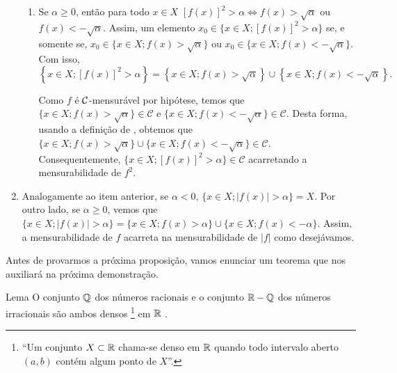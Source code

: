 \begin{prova}
\begin{enumerate}[label*=(\alph*)]
\begin{enumerate}[label = (\roman*)]
                \item Se $\alpha \geq 0$, então para todo $x \in X$ $[f(x)]^2 > \alpha \Leftrightarrow f(x) > \sqrt{\alpha}$ ou $f(x) < -\sqrt{\alpha}$.
                Assim, um elemento 
                $x_0 \in \{x \in X; [f(x)]^2 > \alpha\}$ se, e somente se, $x_0 \in \{x \in X; f(x)> \sqrt{\alpha}\}$ ou \linebreak $x_0 \in \{x \in X; f(x)< -\sqrt{\alpha}\}$.
                Com isso, 
                \vspace{-0.4cm}
                $$\left\{x \in X; [f(x)]^2 > \alpha\right\} = \left\{x \in X; f(x)> \sqrt{\alpha}\right\}\cup \left\{x \in X; f(x)< -\sqrt{\alpha}\right\}.$$
                
                \vspace{-0.4cm}
                Como $f$ é $\operatorname{\mathcal{C}}$-mensurável por hipótese, temos que $\{x \in X; f(x)> \sqrt{\alpha}\} \in \mathcal{C}$ e \linebreak $\{x \in X; f(x)< -\sqrt{\alpha}\} \in \mathcal{C}$.
                Desta forma, usando a definição de \sigal, obtemos que  $\{x \in X; f(x)> \sqrt{\alpha}\} \cup \{x \in X; f(x)< -\sqrt{\alpha}\} \in \mathcal{C}$. Consequentemente, 
                $\{x \in X; [f(x)]^2 > \alpha\} \in \mathcal{C}$ acarretando a mensurabilidade de $f^2$.
            \end{enumerate}
        \item Analogamente ao item anterior, se $\alpha < 0$, $\{x \in X; |f(x)| > \alpha\} = X$.
        Por outro lado, se $\alpha \geq 0$, vemos que 
        $\{x \in X; |f(x)| > \alpha\}=\{x \in X; f(x)> \alpha\} \cup \{x \in X; f(x)< -\alpha\}$.
        Assim, a mensurabilidade de $f$ acarreta na mensurabilidade de $|f|$ como desejávamos.
    \end{enumerate}
\end{prova}

Antes de provarmos a próxima proposição, vamos enunciar um teorema que nos auxiliará na próxima demonstração. 
\begin{env}{Lema}
	\label{lem:densidade de Q em R}
	O conjunto $\operatorname{\mathbb{Q}}$ dos números racionais e o conjunto
	$\mathbb{R} - \operatorname{\mathbb{Q}}$ dos números irracionais são ambos densos
	\footnote{
		\enquote{Um conjunto $X \subset \mathbb{R}$ chama-se denso em $\mathbb{R}$ quando todo
			intervalo aberto $(a, b)$ contém algum ponto de $X$}\cite[p.83]{elon}.}
	 em $\mathbb{R}$ \cite[p.84]{elon}.
\end{env}

